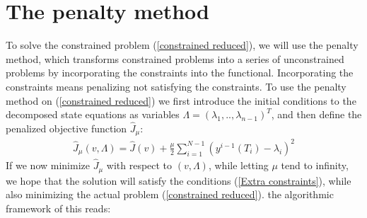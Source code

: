 \documentclass[11pt,a4paper]{article}
\begin{document}
\section{The penalty method}
To solve the constrained problem (\ref{constrained reduced}), we will use the penalty method, which transforms constrained problems into a series of unconstrained problems by incorporating the constraints into the functional. Incorporating the constraints means penalizing not satisfying the constraints. To use the penalty method on (\ref{constrained reduced}) we first introduce the initial conditions to the decomposed state equations as variables $\Lambda = (\lambda_1,..,\lambda_{n-1})^T$, and then define the penalized objective function $\hat J_{\mu}$:
\begin{align}
\hat J_{\mu}(v,\Lambda) = \hat J(v) + \frac{\mu}{2}\sum_{i=1}^{N-1}(y^{i-1}(T_i)-\lambda_i)^2
\end{align}
If we now minimize $\hat{J}_{\mu}$ with respect to $(v,\Lambda)$, while letting $\mu$ tend to infinity, we hope that the solution will satisfy the conditions (\ref{Extra constraints}), while also minimizing the actual problem (\ref{constrained reduced}). the algorithmic framework of this reads:
\end{document}
